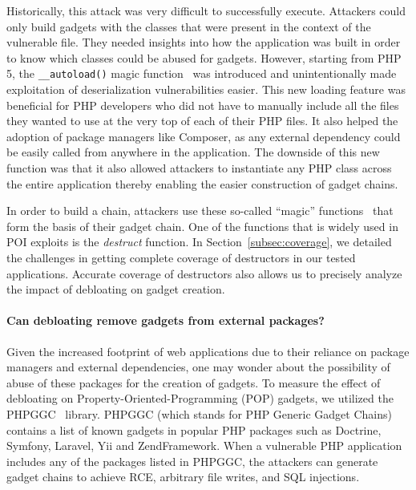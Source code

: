 Historically, this attack was very difficult to successfully execute. Attackers
could only build gadgets with the classes that were present in the context of
the vulnerable file. They needed insights into how the application was built
in order to know which classes could be abused for gadgets. However, starting
from PHP 5, the \texttt{\_\_autoload()} magic function~\cite{PHPAutoload}
was introduced and unintentionally made exploitation of deserialization
vulnerabilities easier. This new loading feature was beneficial for PHP
developers who did not have to manually include all the files they wanted to
use at the very top of each of their PHP files. It also helped the adoption
of package managers like Composer, as any external dependency could be easily
called from anywhere in the application. The downside of this new function
was that it also allowed attackers to instantiate any PHP class across the
entire application thereby enabling the easier construction of gadget chains.

In order to build a chain, attackers use these so-called ``magic''
functions~\cite{PHPWakeup} that form the basis of their gadget chain. One of
the functions that is widely used in POI exploits is the \textit{destruct}
function. In Section~\ref{subsec:coverage}, we detailed the challenges in
getting complete coverage of destructors in our tested applications. Accurate
coverage of destructors also allows us to precisely analyze the impact of
debloating on gadget creation.

\paragraph{Can debloating remove gadgets from external packages?}

Given the increased footprint of web applications due to their reliance
on package managers and external dependencies, one may wonder about the
possibility of abuse of these packages for the creation of gadgets. To
measure the effect of debloating on Property-Oriented-Programming (POP)
gadgets, we utilized the PHPGGC~\cite{PHPGGC} library. PHPGGC (which stands
for PHP Generic Gadget Chains) contains a list of known gadgets in popular
PHP packages such as Doctrine, Symfony, Laravel, Yii and ZendFramework. When
a vulnerable PHP application includes any of the packages listed in PHPGGC,
the attackers can generate gadget chains to achieve RCE, arbitrary file
writes, and SQL injections.

